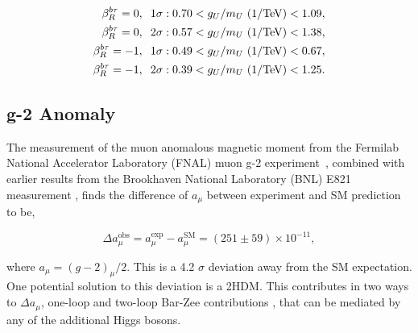 \begin{align}
\begin{split}
\beta^{b\tau}_{R}=0, \hspace{0.2cm} 1\sigma&: 0.70 < g_{U}/m_{U} \text{ (1/TeV)} < 1.09, \\
\beta^{b\tau}_{R}=0, \hspace{0.2cm} 2\sigma&: 0.57 < g_{U}/m_{U} \text{ (1/TeV)} < 1.38, \\
\beta^{b\tau}_{R}=-1, \hspace{0.2cm} 1\sigma&: 0.49 < g_{U}/m_{U} \text{ (1/TeV)} < 0.67, \\
\beta^{b\tau}_{R}=-1, \hspace{0.2cm} 2\sigma&: 0.39 < g_{U}/m_{U} \text{ (1/TeV)} < 1.25.
\end{split}
\end{align}

\subsection{g-2 Anomaly}
\label{sec:gm2_anomaly}

The measurement of the muon anomalous magnetic moment from the Fermilab National Accelerator Laboratory (FNAL) muon g-2 experiment~\cite{Muong-2:2021ojo}, combined with earlier results from the Brookhaven National Laboratory (BNL) E821 measurement \cite{Muong-2:2006rrc}, finds the difference of $a_\mu$ between experiment and SM prediction to be,

\begin{equation}
\Delta a_{\mu}^{\text{obs}} = a_{\mu}^{\text{exp}} - a_{\mu}^{\text{SM}} = (251 \pm 59) \times 10^{-11},
\end{equation}

where $a_{\mu}=(g-2)_{\mu}/2$. 
This is a 4.2 $\sigma$ deviation away from the SM expectation.
One potential solution to this deviation is a 2HDM.
This contributes in two ways to $\Delta a_{\mu}$, one-loop and two-loop Bar-Zee contributions \cite{Ilisie:2015tra,Barr:1990vd}, that can be mediated by any of the additional Higgs bosons. \\

